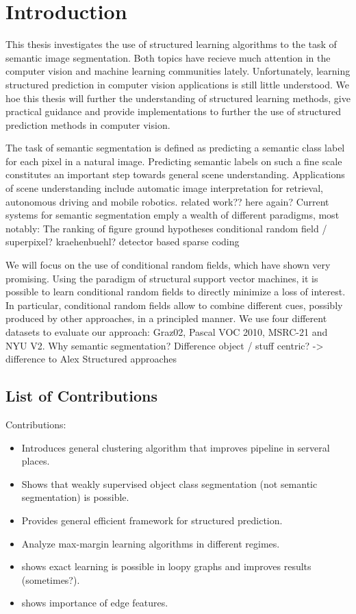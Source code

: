 \chapter{Introduction}
This thesis investigates the use of structured learning algorithms to the task
of semantic image segmentation. Both topics have recieve much attention in the
computer vision and machine learning communities lately. Unfortunately,
learning structured prediction in computer vision applications is still little
understood.  We hoe this thesis will further the understanding of structured
learning methods, give practical guidance and provide implementations to
further the use of structured prediction methods in computer vision.

The task of semantic segmentation is defined as predicting a semantic class label
for each pixel in a natural image. Predicting semantic labels on such a fine scale
constitutes an important step towards general scene understanding.
%
Applications of scene understanding include automatic image interpretation for retrieval,
 autonomous driving and mobile robotics.
%
related work?? here again?
Current systems for semantic segmentation emply a wealth of different paradigms, most notably:
The ranking of figure ground hypotheses
conditional random field / superpixel? kraehenbuehl?
detector based
sparse coding

We will focus on the use of conditional random fields, which have shown very
promising.  Using the paradigm of structural support vector machines, it is
possible to learn conditional random fields to directly minimize a loss of
interest. In particular, conditional random fields allow to combine different
cues, possibly produced by other approaches, in a principled manner.
%
We use four different datasets to evaluate our approach: Graz02, Pascal VOC
2010, MSRC-21 and NYU V2.
%
Why semantic segmentation? Difference object / stuff centric? -> difference to Alex
Structured approaches
%

\section{List of Contributions}
Contributions:
\begin{itemize}
\item Introduces general clustering algorithm that improves pipeline in serveral places.
\item Shows that weakly supervised object class segmentation (not semantic segmentation) is possible.
\item Provides general efficient framework for structured prediction.
\item Analyze max-margin learning algorithms in different regimes.
\item shows exact learning is possible in loopy graphs and improves results (sometimes?).
\item shows importance of edge features.
\end{itemize}

